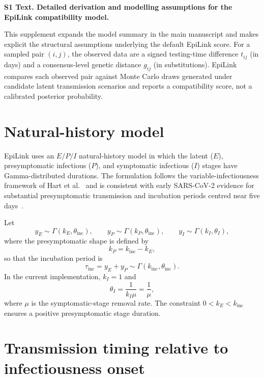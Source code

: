 \documentclass[11pt,a4paper]{article}
\begin{document}
\noindent\textbf{\LARGE S1 Text. Detailed derivation and modelling assumptions for the EpiLink compatibility model.}

\vspace{1.5em}

\noindent This supplement expands the model summary in the main manuscript and makes explicit the structural assumptions underlying the default EpiLink score. For a sampled pair $(i,j)$, the observed data are a signed testing-time difference $t_{ij}$ (in days) and a consensus-level genetic distance $g_{ij}$ (in substitutions). EpiLink compares each observed pair against Monte Carlo draws generated under candidate latent transmission scenarios and reports a compatibility score, not a calibrated posterior probability.

\tableofcontents
\vspace{1em}

\section{Natural-history model}
\label{sec:S1_nathistory}

EpiLink uses an $E/P/I$ natural-history model in which the latent ($E$), presymptomatic infectious ($P$), and symptomatic infectious ($I$) stages have Gamma-distributed durations. The formulation follows the variable-infectiousness framework of Hart et al.~\cite{Hart2021} and is consistent with early SARS-CoV-2 evidence for substantial presymptomatic transmission and incubation periods centred near five days~\cite{He2020, Ferretti2020, Lauer2020, McAloon2020}.

Let
\[
y_E \sim \Gamma(k_E, \theta_{\mathrm{inc}}), \qquad
y_P \sim \Gamma(k_P, \theta_{\mathrm{inc}}), \qquad
y_I \sim \Gamma(k_I, \theta_I),
\]
where the presymptomatic shape is defined by
\[
k_P = k_{\mathrm{inc}} - k_E,
\]
so that the incubation period is
\[
\tau_{\mathrm{inc}} = y_E + y_P \sim \Gamma(k_{\mathrm{inc}}, \theta_{\mathrm{inc}}).
\]
In the current implementation, $k_I = 1$ and
\[
\theta_I = \frac{1}{k_I \mu} = \frac{1}{\mu},
\]
where $\mu$ is the symptomatic-stage removal rate. The constraint $0 < k_E < k_{\mathrm{inc}}$ ensures a positive presymptomatic stage duration.

\section{Transmission timing relative to infectiousness onset}
\label{sec:S1_toit}
\end{document}
